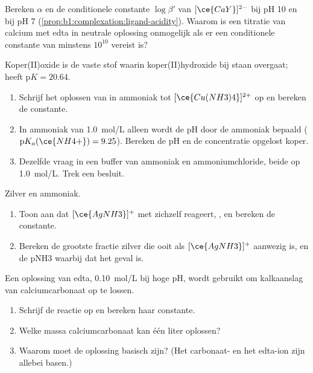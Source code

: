\begin{exercise}[$\star\star$]\label{exo:b1:complexation:9}
Bereken $\alpha$ en de conditionele constante $\log\beta'$ van
$[\ce{CaY}]^{2-}$ bij pH 10 en bij pH 7
(\cref{prop:b1:complexation:ligand-acidity}). Waarom is een titratie van
calcium met edta in neutrale oplossing onmogelijk als er een conditionele
constante van minstens $10^{10}$ vereist is?
\end{exercise}

\begin{exercise}[$\star\star\star$]\label{exo:b1:complexation:10}
Koper(II)oxide  is de vaste stof waarin koper(II)hydroxide bij
staan overgaat;  heeft
$\mathrm{p}K = 20.64$.
\begin{enumerate}
  \item Schrijf het oplossen van  in ammoniak tot
        $[\ce{Cu(NH3)4}]^{2+}$ op en bereken de constante.
  \item In ammoniak van \qty{1.0}{mol/L} alleen wordt de pH door de
        ammoniak bepaald ($\mathrm{p}K_a(\ce{NH4+}) = 9.25$). Bereken de pH
        en de concentratie opgelost koper.
  \item Dezelfde vraag in een buffer van ammoniak en ammoniumchloride,
        beide op \qty{1.0}{mol/L}. Trek een besluit.
\end{enumerate}
\end{exercise}

\begin{exercise}[$\star\star\star$]\label{exo:b1:complexation:11}
Zilver en ammoniak.
\begin{enumerate}
  \item Toon aan dat $[\ce{AgNH3}]^{+}$ met zichzelf reageert,
        , en bereken de constante.
  \item Bereken de grootste fractie zilver die ooit als
        $[\ce{AgNH3}]^{+}$ aanwezig is, en de pNH3 waarbij dat het geval
        is.
\end{enumerate}
\end{exercise}

\begin{exercise}[$\star\star\star$]\label{exo:b1:complexation:12}
Een oplossing van edta, \qty{0.10}{mol/L}  bij hoge pH, wordt
gebruikt om kalkaanslag van calciumcarbonaat op te lossen.
\begin{enumerate}
  \item Schrijf de reactie op en bereken haar constante.
  \item Welke massa calciumcarbonaat kan één liter oplossen?
  \item Waarom moet de oplossing basisch zijn? (Het carbonaat- en het
        edta-ion zijn allebei basen.)
\end{enumerate}
\end{exercise}

